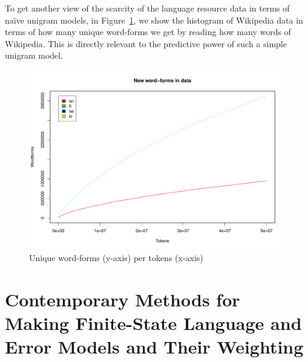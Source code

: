 \documentclass[a4paper,12pt]{article}
\begin{document}
To get another view of the scarcity of the language resource data in terms
of naïve unigram models, in Figure~\ref{fig:forms-vs-tokens}, we show the
histogram of Wikipedia data in terms of how many unique word-forms we get by
reading how many words of Wikipedia. This is directly relevant to the
predictive power of such a simple unigram model.

\begin{figure}
    \centering
    \includegraphics[width=\textwidth]{graphicx/formspertokens}
    \caption{Unique word-forms (y-axis) per tokens (x-axis)
    \label{fig:forms-vs-tokens}}
\end{figure}

\section{Contemporary Methods for Making Finite-State Language and Error Models
and Their Weighting}
\label{sec:methods}
\end{document}

